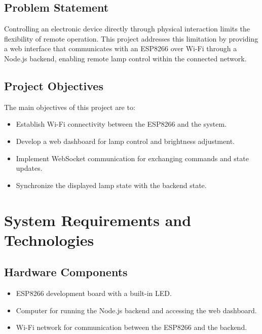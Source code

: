 \documentclass[12pt,a4paper]{article}
\begin{document}
\vspace{0.5cm}

\subsection*{Problem Statement}
Controlling an electronic device directly through physical interaction
limits the flexibility of remote operation. This project addresses this
limitation by providing a web interface that communicates with an ESP8266
over Wi-Fi through a Node.js backend, enabling remote lamp control within
the connected network.

\vspace{0.5cm}

\subsection*{Project Objectives}
The main objectives of this project are to:
\begin{itemize}
    \item Establish Wi-Fi connectivity between the ESP8266 and the system.
    \item Develop a web dashboard for lamp control and brightness adjustment.
    \item Implement WebSocket communication for exchanging commands and state updates.
    \item Synchronize the displayed lamp state with the backend state.
\end{itemize}



\newpage
\section*{System Requirements and Technologies}

\vspace{0.2cm}

\subsection*{Hardware Components}
\begin{itemize}
    \item ESP8266 development board with a built-in LED.
    \item Computer for running the Node.js backend and accessing the web dashboard.
    \item Wi-Fi network for communication between the ESP8266 and the backend.
\end{itemize}
\end{document}
